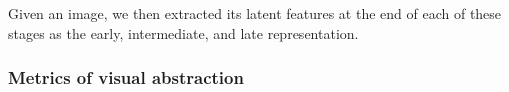 \documentclass[10pt,letterpaper]{article}
\begin{document}


Given an image, we then extracted its latent features at the end of each of these stages as the early, intermediate, and late representation.

\subsubsection{Metrics of visual abstraction} 
\end{document}
